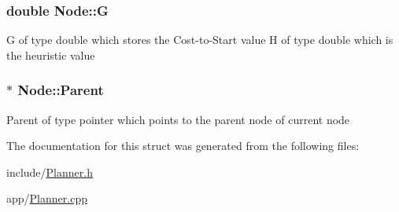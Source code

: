 \subsubsection[{\texorpdfstring{G}{G}}]{\setlength{\rightskip}{0pt plus 5cm}double Node\+::G}\hypertarget{structNode_aa6f89ef69e082186d2ab507ba1376940}{}\label{structNode_aa6f89ef69e082186d2ab507ba1376940}
G of type double which stores the Cost-\/to-\/\+Start value H of type double which is the heuristic value 
\subsubsection[{\texorpdfstring{Parent}{Parent}}]{$\ast$ Node\+::\+Parent}\hypertarget{structNode_a5033f94f526ada5d9001143e2bc9dd48}{}\label{structNode_a5033f94f526ada5d9001143e2bc9dd48}
Parent of type pointer which points to the parent node of current node 

The documentation for this struct was generated from the following files\+:\begin{DoxyCompactItemize}
\item 
include/\hyperlink{Planner_8h}{Planner.\+h}\item 
app/\hyperlink{Planner_8cpp}{Planner.\+cpp}\end{DoxyCompactItemize}
